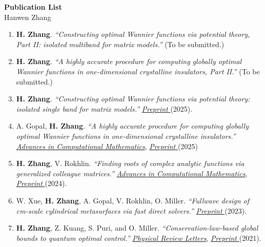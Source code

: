 \documentclass[11pt]{article}
\begin{document}
	
	\begin{center}
		{\Large \textbf{Publication List}}\\[6pt]
		{\large Hanwen Zhang}
	\end{center}
	
	\vspace{1em}
	
	\begin{enumerate}[leftmargin=1.5em, itemsep=0.6em]
		
		\item \textbf{H. Zhang}. \textit{“Constructing optimal Wannier functions via potential theory, Part II: isolated multiband for matrix models.”} (To be submitted.)
		
		\item \textbf{H. Zhang}. \textit{“A highly accurate procedure for computing globally optimal Wannier functions in one-dimensional crystalline insulators, Part II.”} (To be submitted.)
		
		\item \textbf{H. Zhang}. \textit{“Constructing optimal Wannier functions via potential theory: isolated single band for matrix models.”} \href{https://arxiv.org/abs/2502.08641}{\color{blue} \emph{Preprint} }(2025).
		
		\item A. Gopal, \textbf{H. Zhang}. \textit{“A highly accurate procedure for computing globally optimal Wannier functions in one-dimensional crystalline insulators.”} \href{https://link.springer.com/article/10.1007/s10444-025-10266-4}{\color{blue}  \emph{Advances in Computational Mathematics}},   \href{https://arxiv.org/abs/2409.04369}{\color{blue} \emph{Preprint} }(2025)
		
		\item \textbf{H. Zhang}, V. Rokhlin. \textit{“Finding roots of complex analytic functions via generalized colleague matrices.”} \href{https://link.springer.com/article/10.1007/s10444-024-10174-z}{\color{blue}  \emph{Advances in Computational Mathematics}},    \href{https://arxiv.org/abs/2307.14494}{\color{blue} \emph{Preprint} }(2024).
		
		\item W. Xue, \textbf{H. Zhang}, A. Gopal, V. Rokhlin, O. Miller. \textit{“Fullwave design of cm-scale cylindrical metasurfaces via fast direct solvers.”} \href{https://arxiv.org/abs/2308.08569}{\color{blue} \emph{Preprint} }(2023).
		
		\item \textbf{H. Zhang}, Z. Kuang, S. Puri, and O. Miller. \textit{“Conservation-law-based global bounds to quantum optimal control.”} \href{https://journals.aps.org/prl/abstract/10.1103/PhysRevLett.127.110506}{\color{blue}  \emph{Physical Review Letters}},    \href{https://arxiv.org/abs/2105.06054}{\color{blue} \emph{Preprint} }(2021).


\end{enumerate}
\end{document}
